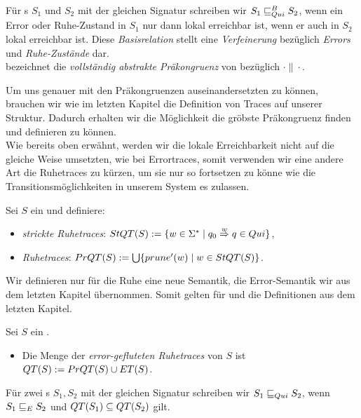 \begin{Def}
  Für \EIO{}s $S_1$ und $S_2$ mit der gleichen Signatur schreiben wir
  $S_1\sqsubseteq _{Qui}^B S_2$, wenn ein Error oder Ruhe-Zustand in $S_1$ nur dann lokal
  erreichbar ist, wenn er auch in $S_2$ lokal erreichbar ist. Diese
  \emph{Basisrelation} stellt eine \emph{Verfeinerung} bezüglich \emph{Errors}
  und \emph{Ruhe-Zustände} dar.\\
  \QCRel{} bezeichnet die \emph{vollständig abstrakte Präkongruenz} von
  \QBRel{} bezüglich $\cdot\|\cdot$.
\end{Def}

Um uns genauer mit den Präkongruenzen auseinandersetzten zu können, brauchen
wir wie im letzten Kapitel die Definition von Traces auf unserer Struktur.
Dadurch erhalten wir die Möglichkeit die gröbste Präkongruenz finden und
definieren zu können.\\
Wie bereits oben erwähnt, werden wir die lokale Erreichbarkeit nicht auf die
gleiche Weise umsetzten, wie bei Errortraces, somit verwenden wir eine andere
Art die Ruhetraces zu kürzen, um sie nur so fortsetzen zu könne wie die
Transitionsmöglichkeiten in unserem System es zulassen.

\begin{Def}[Ruhetraces]
  \label{DefRuhetraces}
  Sei $S$ ein \EIO{} und definiere:
  \begin{itemize}
    \item \emph{strickte Ruhetraces}: $StQT{}(S) := \{w\in\Sigma ^*\mid q_0
      \overset{w}{\Rightarrow} q\in Qui\}$,
    \item \emph{Ruhetraces}: $PrQT{}(S) := \bigcup\{prune'(w)\mid
      w\in StQT{}(S)\}$.
  \end{itemize}
\end{Def}

Wir definieren nur für die Ruhe eine neue Semantik, die Error-Semantik wir aus
dem letzten Kapitel übernommen. Somit gelten für \ET{} und \EL{} die
Definitionen aus dem letzten Kapitel.

\begin{Def}
  \label{DefQTQL}
  Sei $S$ ein \EIO{}.
  \begin{itemize}
    \item Die Menge der \emph{error-gefluteten Ruhetraces} von $S$ ist
      $QT{}(S) := PrQT{}(S)\cup ET{}(S)$.
  \end{itemize}
  Für zwei \EIO{}s $S_1, S_2$ mit der gleichen Signatur schreiben wir
  $S_1\sqsubseteq _{Qui} S_2$, wenn $S_1\sqsubseteq _E S_2$ und $QT{}(S_1)\subseteq QT{}(S_2)$ gilt.
\end{Def}

